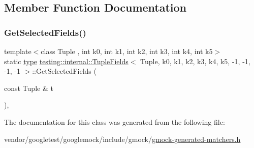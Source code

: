 \subsection{Member Function Documentation}
\mbox{\label{classtesting_1_1internal_1_1_tuple_fields_3_01_tuple_00_01k0_00_01k1_00_01k2_00_01k3_00_01k4_00_fc3c297a037e5312ea5ea32562e3997e_a15b4c351182e3b52ec7ce67cb6beb0f8}} 
\subsubsection{\texorpdfstring{Get\+Selected\+Fields()}{GetSelectedFields()}}
{\footnotesize\ttfamily template$<$class Tuple , int k0, int k1, int k2, int k3, int k4, int k5$>$ \\
static \hyperlink{classtesting_1_1internal_1_1_tuple_fields_3_01_tuple_00_01k0_00_01k1_00_01k2_00_01k3_00_01k4_00_fc3c297a037e5312ea5ea32562e3997e_a4e9aef3e026c3b30cfc21b6776616926}{type} \hyperlink{classtesting_1_1internal_1_1_tuple_fields}{testing\+::internal\+::\+Tuple\+Fields}$<$ Tuple, k0, k1, k2, k3, k4, k5, -\/1, -\/1, -\/1, -\/1 $>$\+::Get\+Selected\+Fields (\begin{DoxyParamCaption}\item[{const Tuple \&}]{t }\end{DoxyParamCaption})\hspace{0.3cm}{\ttfamily [inline]}, {\ttfamily [static]}}



The documentation for this class was generated from the following file\+:\begin{DoxyCompactItemize}
\item 
vendor/googletest/googlemock/include/gmock/\hyperlink{gmock-generated-matchers_8h}{gmock-\/generated-\/matchers.\+h}\end{DoxyCompactItemize}
